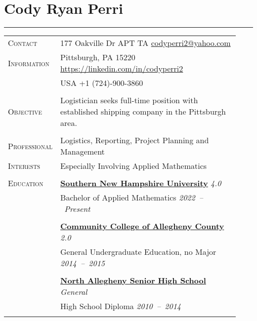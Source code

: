 \documentclass[letterpaper, 10pt, oneside]{article}
\newcommand{\stitle}[1]{\normalsize{\textsc{#1}}}
\begin{document}
\noindent\section*{Cody Ryan Perri}
\rule{\textwidth}{0.5ex}


\noindent \begin{longtable}{@{} p{0.13\linewidth} p{0.8\linewidth}}
  \stitle{Contact}     & 177 Oakville Dr APT TA
  \hfill \href{mailto:codyperri2@yahoo.com}{codyperri2@yahoo.com} \\
  
  \stitle{Information} & Pittsburgh, PA 15220
  \hfill \url{https://linkedin.com/in/codyperri2} \\
  
  & USA \hfill \textcolor{color-url}{+1 (724)-900-3860} \\ \\

  \stitle{Objective} & Logistician seeks full-time position with established shipping company in the Pittsburgh area.\\ \\
  
  \stitle{Professional} & Logistics, Reporting, Project Planning and Management \\
  \stitle{Interests}   & Especially Involving Applied Mathematics \\ \\

  \stitle{Education}
  
  & \textbf{\href{https://www.snhu.edu/}{Southern New Hampshire University}}
  \hfill \textsl{4.0} \\[-1.25em] & Bachelor of Applied Mathematics
  \hfill \hspace{-3em} \textsl{2022\ --\ Present} \\

  \\[-1.8ex]

  & \textbf{\href{https://www.ccac.edu/}{Community College of Allegheny County}}
  \hfill \textsl{2.0} \\
  & General Undergraduate Education, no Major
  \hfill \hspace{-3em} \textsl{2014\ --\ 2015} \\

  \\[-1.8ex]

  & \textbf{\href{https://www.northallegheny.org/}{North Allegheny Senior High School}}
  \hfill \textsl{General} \\
  & High School Diploma
  \hfill \hspace{-3em} \textsl{2010\ --\ 2014} \\ \\


\end{longtable}
\end{document}
